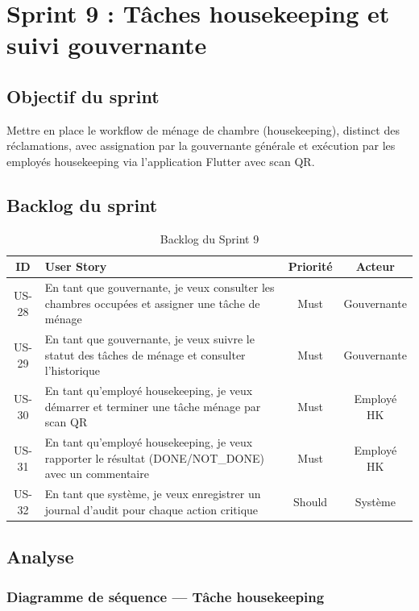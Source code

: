 \section{Sprint 9 : Tâches housekeeping et suivi gouvernante}
\label{sec:sprint9}

\subsection{Objectif du sprint}

Mettre en place le workflow de ménage de chambre (housekeeping), distinct des réclamations, avec assignation par la gouvernante générale et exécution par les employés housekeeping via l'application Flutter avec scan QR.

\subsection{Backlog du sprint}

\begin{table}[H]
\centering
\caption{Backlog du Sprint 9}
\label{tab:backlog_sprint9}
\begin{tabular}{|c|p{8.5cm}|c|c|}
\hline
\textbf{ID} & \textbf{User Story} & \textbf{Priorité} & \textbf{Acteur} \\
\hline
US-28 & En tant que gouvernante, je veux consulter les chambres occupées et assigner une tâche de ménage & Must & Gouvernante \\
\hline
US-29 & En tant que gouvernante, je veux suivre le statut des tâches de ménage et consulter l'historique & Must & Gouvernante \\
\hline
US-30 & En tant qu'employé housekeeping, je veux démarrer et terminer une tâche ménage par scan QR & Must & Employé HK \\
\hline
US-31 & En tant qu'employé housekeeping, je veux rapporter le résultat (DONE/NOT\_DONE) avec un commentaire & Must & Employé HK \\
\hline
US-32 & En tant que système, je veux enregistrer un journal d'audit pour chaque action critique & Should & Système \\
\hline
\end{tabular}
\end{table}

\subsection{Analyse}

\subsubsection{Diagramme de séquence — Tâche housekeeping}

